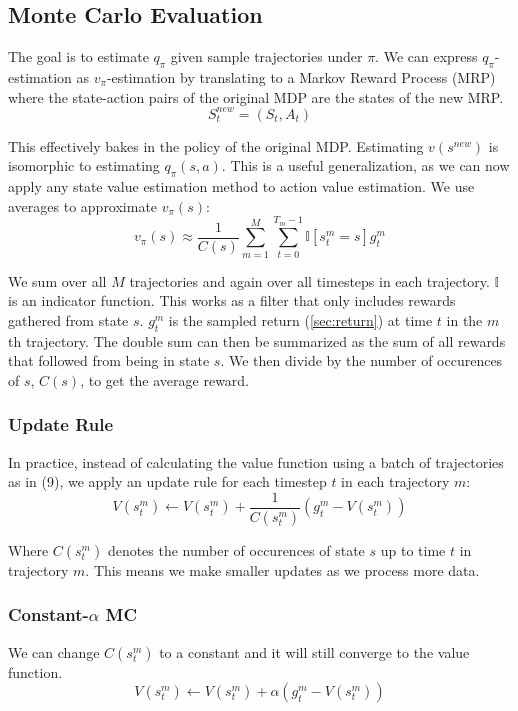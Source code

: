 \documentclass{article}
\begin{document}
\subsection{Monte Carlo Evaluation}
\label{sec:mc-evaluation}
The goal is to estimate $q_\pi$ given sample trajectories under $\pi$. 
We can express $q_\pi$-estimation as $v_\pi$-estimation by translating to a Markov Reward Process (MRP)
where the state-action pairs of the original MDP are the states of the new MRP.
\begin{equation*}
  S_t^{new} = (S_t, A_t)
\end{equation*}

This effectively bakes in the policy of the original MDP.
Estimating $v(s^{new})$ is isomorphic to estimating $q_\pi(s,a)$. 
This is a useful generalization, as we can now apply any state value estimation method to action value estimation.
We use averages to approximate $v_\pi(s)$:
\begin{equation}
  v_\pi(s) \approx \frac{1}{C(s)} \sum_{m=1}^{M} \sum_{t=0}^{T_m-1} \mathbb{I}[s_t^m = s] g_t^m
\end{equation}

We sum over all $M$ trajectories and again over all timesteps in each trajectory.
$\mathbb{I}$ is an indicator function. This works as a filter that only includes rewards gathered from state $s$.
$g_t^m$ is the sampled return (\ref{sec:return}) at time $t$ in the $m$th trajectory. The double sum can then be
summarized as the sum of all rewards that followed from being in state $s$. We then
divide by the number of occurences of $s$, $C(s)$, to get the average reward.

\subsubsection{Update Rule}
In practice, instead of calculating the value function using a batch of trajectories as in (9),
we apply an update rule for each timestep $t$ in each trajectory $m$:
\begin{equation}
  V(s_t^m) \leftarrow V(s_t^m) + \frac{1}{C(s_t^m)} (g_t^m - V(s_t^m))
\end{equation}

Where $C(s_t^m)$ denotes the number of occurences of state $s$ up to time $t$ in trajectory $m$.
This means we make smaller updates as we process more data.

\subsubsection{Constant-$\alpha$ MC}
\label{sec:update-rule}
We can change $C(s_t^m)$ to a constant and it will still converge to the value function.
\begin{equation}
  V(s_t^m) \leftarrow V(s_t^m) + \alpha (g_t^m - V(s_t^m))
\end{equation}
\end{document}
